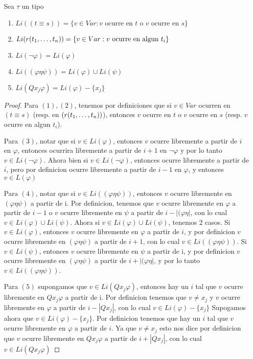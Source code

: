 \begin{lemma}
  Sea $\tau$ un tipo
  \begin{enumerate}
    \item $Li((t\equiv s)) = \{v \in Var : v \text{ ocurre en } t \text{ o } v \text{ ocurre en } s\}$
    \item $Li(r(t_{1}, \dots, t_{n})) = \{v \in Var : v \text{ ocurre en algun } t_i\}$
    \item $Li(\neg\varphi) = Li(\varphi)$
    \item $Li((\varphi\eta\psi)) = Li(\varphi) \cup Li(\psi)$
    \item $Li(Qx_j\varphi) = Li(\varphi) - \{x_j\}$
  \end{enumerate}
\end{lemma}
\begin{proof}
  Para $(1), (2)$, tenemos por definiciones que si $v\in Var$ ocurren en $(t\equiv s)$ (resp. en $(r(t_{1}, \dots, t_{n}))$), entonces 
  $v$ ocurre en $t$ o $v$ ocurre en $s$ (resp. $v$ ocurre en algun $t_i$).

  Para $(3)$, notar que si $v \in Li(\varphi)$, entonces $v$ ocurre libremente a partir de $i$ en $\varphi$, entonces ocurrira libremente a partir de $i+1$ en $\neg\varphi$
  y por lo tanto $v \in Li(\neg\varphi)$. Ahora bien si $v \in Li(\neg\varphi)$, entonces ocurre libremente a partir de $i$, pero por definicion ocurre libremente a partir de $i-1$ en $\varphi$, y entonces $v \in L(\varphi)$

  Para $(4)$, notar que si $v \in Li((\varphi\eta\psi))$, entonces $v$ ocurre libremente en $(\varphi\eta\psi)$ a partir de i. Por definicion, tenemos que $v$ ocurre libremente en $\varphi$ a partir de $i-1$ o 
  $v$ ocurre libremente en $\psi$ a partir de $i - |(\varphi\eta|$, con lo cual $v\in Li(\varphi)\cup Li(\psi)$.
  Ahora si $v \in Li(\varphi)\cup Li(\psi)$, tenemos 2 casos. Si $v \in Li(\varphi)$, entonces $v$ ocurre libremente en $\varphi$ a partir de $i$, y por definicion 
  $v$ ocurre libremente en $(\varphi\eta\psi)$ a partir de $i+1$, con lo cual $v \in Li((\varphi\eta\psi))$. Si $v\in Li(\psi)$, entonces $v$ ocurre libremente en $\psi$ a partir de i, y por definicion
  $v$ ocurre libremente en $(\varphi\eta\psi)$ a partir de $i+|(\varphi\eta|$, y por lo tanto $v \in Li((\varphi\eta\psi))$.

  Para $(5)$ supongamos que $v\in Li(Q x_j \varphi)$, entonces hay un $i$ tal que $v$ ocurre libremente 
  en $Q x_j \varphi$ a partir de i. Por definicion tenemos que $v \neq x_j$ y $v$ ocurre libremente en $\varphi$ a partir de $i - |Q x_j|$, con lo cual $v \in Li(\varphi) - \{x_j\}$
  Supogamos ahora que $v \in Li(\varphi) - \{x_j\}$. Por definicion tenemos que hay un $i$ tal que $v$ ocurre libremente en $\varphi$ a partir de $i$. Ya que $v \neq x_j$ esto 
  nos dice por definicion que $v$ ocurre libremente en $Q x_j \varphi$ a partir de $i + |Q x_j|$, con lo cual $v \in Li(Q x_j \varphi)$
\end{proof}

